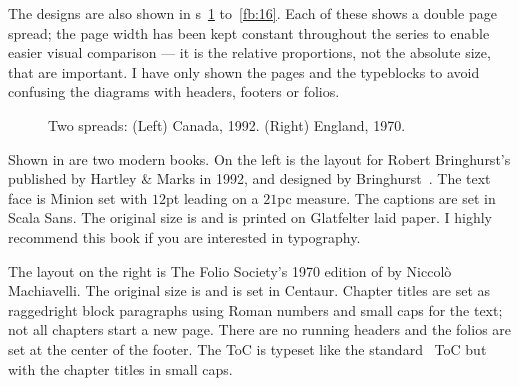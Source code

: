 \documentclass[10pt,a4paper,extrafontsizes]{memoir}
\begin{document}
\begin{paracol}{2}
    The designs are also shown in \figurerefname s~\ref{fb:1} 
to~\ref{fb:16}. Each of these shows a double page spread; the 
page width has been kept constant throughout the series to enable easier
visual comparison --- it is the relative proportions, not the absolute size, 
that are important. I have only shown the pages and the typeblocks to avoid
confusing the diagrams with headers, footers 
or folios.
\end{paracol}

\begin{figure}
\centering
\begin{minipage}[b]{\pwlayi}
\end{minipage}
\hfill
\begin{minipage}[b]{\pwlayi}
\end{minipage}
\caption[Two spreads: Canada, 1992 and England, 1970]%
        {Two spreads: (Left) Canada, 1992. %
         (Right) England, 1970.} \label{fb:1}
\end{figure}

\begin{paracol}{2}
\switchEng
    Shown in  are two modern books. On the left is the layout
for Robert Bringhurst's 
 published
by Hartley \& Marks in 1992, and designed by Bringhurst~\autocite{BRINGHURST99}. 
The text face is
Minion set with $12$pt leading on a $21$pc measure. 
The captions are set in Scala Sans. The original
size is  and is printed on Glatfelter laid 
paper. 
I highly recommend this book if you are
interested in typography. 

The layout on the right is The Folio Society's
1970 edition of  by Niccol\`{o} Machiavelli. The original
size is  and is set in  
Centaur.
Chapter titles are set as raggedright block 
paragraphs using Roman numbers
and small caps for the text; not all chapters start a new page. There are
no running headers and the folios 
are set at the center of the footer.
The ToC is typeset like the standard \ltx\ ToC 
but with the chapter titles
in small caps.
\end{paracol}
\end{document}
